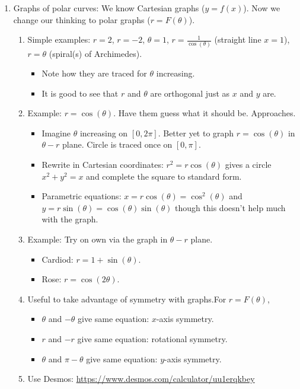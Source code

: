 \documentclass{article}
\begin{document}
\begin{enumerate}
\item Graphs of polar curves: We know Cartesian graphs ($y=f(x)$). Now we change our thinking to polar graphs ($r=F(\theta)$). 
\begin{enumerate}
\item Simple examples: $r=2$, $r=-2$, $\theta=1$, $r=\frac{1}{\cos(\theta)}$ (straight line $x=1$), $r=\theta$ (spiral(s) of Archimedes). 
\begin{itemize}
\item Note how they are traced for $\theta$ increasing.
\item It is good to see that $r$ and $\theta$ are orthogonal just as $x$ and $y$ are.
\end{itemize}
\item Example: $r=\cos(\theta)$. Have them guess what it should be. Approaches.
\begin{itemize}
\item Imagine $\theta$ increasing on $[0,2\pi]$. Better yet to graph $r=\cos(\theta)$ in $\theta-r$ plane. Circle is traced once on $[0,\pi]$. 
\item Rewrite in Cartesian coordinates: $r^2=r\cos(\theta)$ gives a circle $x^2+y^2=x$ and complete the square to standard form.
\item Parametric equations: $x=r\cos(\theta)=\cos^2(\theta)$ and $y=r\sin(\theta) = \cos(\theta)\sin(\theta)$ though this doesn't help much with the graph.
\end{itemize}
\item Example: Try on own via the graph in $\theta-r$ plane.
\begin{itemize}
\item Cardiod: $r = 1+\sin(\theta)$.
\item Rose: $r=\cos(2\theta)$. 
\end{itemize}
\item Useful to take advantage of symmetry with graphs.For $r=F(\theta)$, 
\begin{itemize}
\item $\theta$ and $-\theta$ give same equation: $x$-axis symmetry.
\item $r$ and $-r$ give same equation: rotational symmetry.
\item $\theta$ and $\pi - \theta$ give same equation: $y$-axis symmetry.
\end{itemize}
\item Use Desmos: \url{https://www.desmos.com/calculator/uu1erqkbey}
\end{enumerate}


\end{enumerate}
\end{document}
